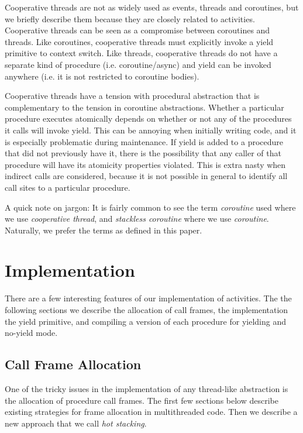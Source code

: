 \documentclass[10pt,preprint]{sigplanconf}
\begin{document}
Cooperative threads are not as widely used as events, threads and coroutines, but we briefly describe them because they are closely related to activities.
Cooperative threads can be seen as a compromise between coroutines and threads.
Like coroutines, cooperative threads must explicitly invoke a yield primitive to context switch.
Like threads, cooperative threads do not have a separate kind of procedure (i.e. coroutine/async) and yield can be invoked anywhere (i.e. it is not restricted to coroutine bodies).

Cooperative threads have a tension with procedural abstraction that is complementary to the tension in coroutine abstractions.
Whether a particular procedure executes atomically depends on whether or not any of the procedures it calls will invoke yield.
This can be annoying when initially writing code, and it is especially problematic during maintenance.
If yield is added to a procedure that did not previously have it, there is the possibility that any caller of that procedure will have its atomicity properties violated.
This is extra nasty when indirect calls are considered, because it is not possible in general to identify all call sites to a particular procedure.

A quick note on jargon: It is fairly common to see the term \emph{coroutine} used where we use \emph{cooperative thread}, and \emph{stackless coroutine} where we use \emph{coroutine}.
Naturally, we prefer the terms as defined in this paper.


\section{Implementation}

There are a few interesting features of our implementation of activities.
The the following sections we describe the allocation of call frames, the implementation the yield primitive, and compiling a version of each procedure for yielding and no-yield mode.

\subsection{Call Frame Allocation}

One of the tricky issues in the implementation of any thread-like abstraction is the allocation of procedure call frames.
The first few sections below describe existing strategies for frame allocation in multithreaded code.
Then we describe a new approach that we call \emph{hot stacking}.
\end{document}
